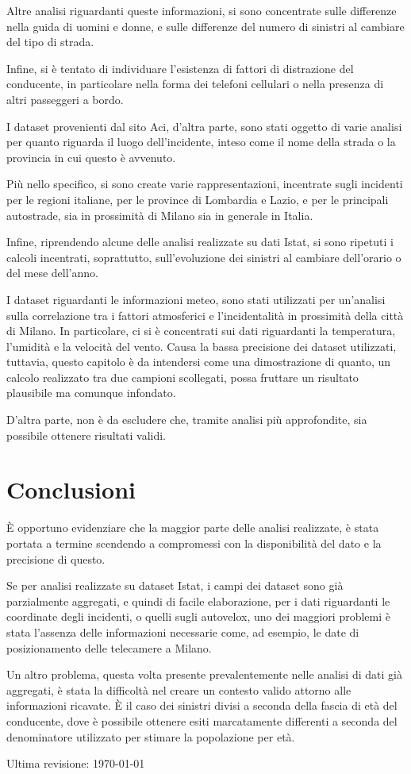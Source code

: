 \documentclass[a4paper]{article}
\newcommand{\skipline}{\vspace{0.2in}}
\begin{document}
Altre analisi riguardanti queste informazioni, si sono concentrate sulle differenze nella 
guida di uomini e donne, e sulle differenze del numero di sinistri al cambiare 
del tipo di strada. 

Infine, si è tentato di individuare l'esistenza di fattori di distrazione del 
conducente, in particolare nella forma dei telefoni cellulari o nella presenza 
di altri passeggeri a bordo. 

\skipline
I dataset provenienti dal sito Aci, d'altra parte, sono stati oggetto di varie analisi per 
quanto riguarda il luogo dell'incidente, inteso come il nome della strada o la provincia 
in cui questo è avvenuto. 

Più nello specifico, si sono create varie rappresentazioni, incentrate sugli incidenti 
per le regioni italiane, per le province di Lombardia e Lazio, e per le 
principali autostrade, sia in prossimità di Milano sia in generale in Italia. 

Infine, riprendendo alcune delle analisi realizzate su dati Istat, si sono ripetuti i 
calcoli incentrati, soprattutto, sull'evoluzione dei sinistri al cambiare dell'orario 
o del mese dell'anno.

\skipline
I dataset riguardanti le informazioni meteo, sono stati utilizzati per un'analisi sulla 
correlazione tra i fattori atmosferici e l'incidentalità in 
prossimità della città di Milano. 
In particolare, ci si è concentrati sui dati riguardanti la temperatura, 
l'umidità e la velocità del vento. 
Causa la bassa precisione dei dataset utilizzati, tuttavia, questo capitolo è 
da intendersi come una dimostrazione di quanto, un calcolo realizzato tra due campioni 
scollegati, possa fruttare un risultato plausibile ma comunque infondato. 

D'altra parte, non è da escludere che, tramite analisi più approfondite, 
sia possibile ottenere risultati validi.

\section{Conclusioni}

\`E opportuno evidenziare che la maggior parte delle analisi realizzate, 
è stata portata a termine scendendo a compromessi con la disponibilità del dato e la 
precisione di questo. 


Se per analisi realizzate su dataset Istat, i campi dei dataset sono già 
parzialmente aggregati, e quindi di facile elaborazione, 
per i dati riguardanti le coordinate degli incidenti, 
o quelli sugli autovelox, uno dei maggiori problemi è stata l'assenza delle 
informazioni necessarie come, ad esempio, le date di 
posizionamento delle telecamere a Milano. 


Un altro problema, questa volta presente prevalentemente nelle analisi di dati già aggregati, 
è stata la difficoltà nel creare un contesto valido attorno alle informazioni ricavate. 
\`E il caso dei sinistri divisi a seconda della fascia di età del conducente, dove è possibile 
ottenere esiti marcatamente differenti a seconda del denominatore utilizzato per 
stimare la popolazione per età.

\raggedleft\vfill\scriptsize Ultima revisione: \today\par
\end{document}
